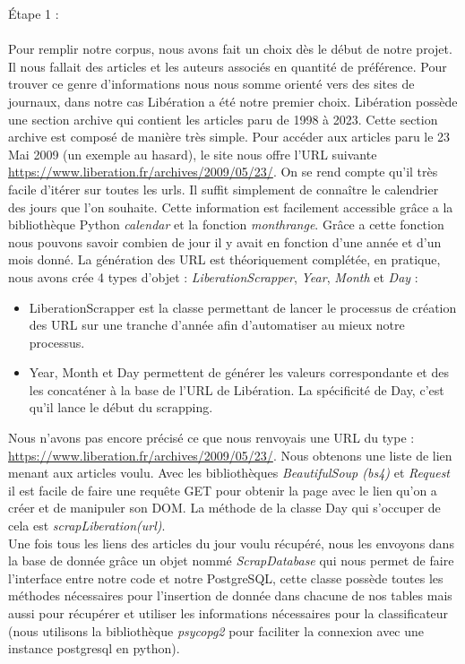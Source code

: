\documentclass[french,12pt]{article}
\begin{document}
Étape 1 : \\\\
Pour remplir notre corpus, nous avons fait un choix dès le début de notre projet.\\
Il nous fallait des articles et les auteurs associés en quantité de préférence. Pour trouver ce genre d'informations nous nous somme orienté vers des sites de journaux, dans notre cas Libération a été notre premier choix. Libération possède une section archive qui contient les articles paru de 1998 à 2023. Cette section archive est composé de manière très simple. Pour accéder aux articles paru le 23 Mai 2009 (un exemple au hasard), le site nous offre l'URL suivante \hyperlink{https://www.liberation.fr/archives/2009/05/23/}{https://www.liberation.fr/archives/2009/05/23/}. On se rend compte qu'il très facile d'itérer sur toutes les urls. Il suffit simplement de connaître le calendrier des jours que l'on souhaite. Cette information est facilement accessible grâce a la bibliothèque Python \textit{calendar} et la fonction \textit{monthrange}. Grâce a cette fonction nous pouvons savoir combien de jour il y avait en fonction d'une année et d'un mois donné. La génération des URL est théoriquement complétée, en pratique, nous avons crée 4 types d'objet : \textit{LiberationScrapper}, \textit{Year}, \textit{Month} et \textit{Day} :\\

\begin{itemize}
    \item LiberationScrapper est la classe permettant de lancer le processus de création des URL sur une tranche d'année afin d'automatiser au mieux notre processus.\\
    \item Year, Month et Day permettent de générer les valeurs correspondante et des les concaténer à la base de l'URL de Libération. La spécificité de Day, c'est qu'il lance le début du scrapping.\\
\end{itemize}

Nous n'avons pas encore précisé ce que nous renvoyais une URL du type : \hyperlink{https://www.liberation.fr/archives/2009/05/23/}{https://www.liberation.fr/archives/2009/05/23/}. Nous obtenons une liste de lien menant aux articles voulu. Avec les bibliothèques \textit{BeautifulSoup (bs4)} et \textit{Request} il est facile de faire une requête GET pour obtenir la page avec le lien qu'on a créer et de manipuler son DOM. La méthode de la classe Day qui s'occuper de cela est \textit{scrapLiberation(url)}.\\
Une fois tous les liens des articles du jour voulu récupéré, nous les envoyons dans la base de donnée grâce un objet nommé \textit{ScrapDatabase} qui nous permet de faire l'interface entre notre code et notre PostgreSQL, cette classe possède toutes les méthodes nécessaires pour l'insertion de donnée dans chacune de nos tables mais aussi pour récupérer et utiliser les informations nécessaires pour la classificateur (nous utilisons la bibliothèque \textit{psycopg2} pour faciliter la connexion avec une instance postgresql en python).\\\\
\end{document}
